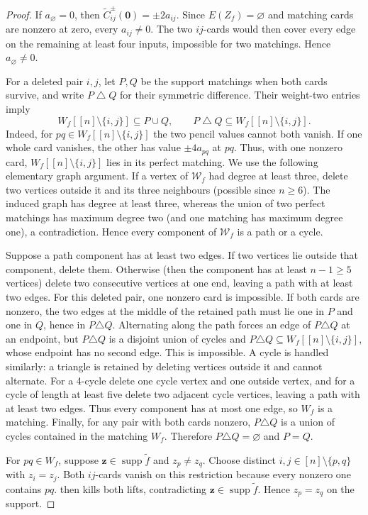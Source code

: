 \documentclass[11pt,letterpaper,onecolumn]{article}
\theoremstyle{plain}
\theoremstyle{definition}
\theoremstyle{remark}
\newcommand{\supp}{\operatorname{supp}}
\newcommand{\zero}{\mathbf 0}
\begin{document}
\begin{proof}
If \(a_\varnothing=0\), then
\(\widetilde C_{ij}^{\pm}(\zero)=\pm2a_{ij}\).  Since
\(E(Z_f)=\varnothing\)
and matching cards are nonzero at zero, every \(a_{ij}\ne0\).  The two
\(ij\)-cards would then cover every edge on the remaining at least four
inputs, impossible for two matchings.  Hence \(a_\varnothing\ne0\).

For a deleted pair \(i,j\), let \(P,Q\) be the support matchings when both
cards survive, and write \(P\mathbin\triangle Q\) for their symmetric
difference.  Their weight-two entries imply
\begin{equation*}
  W_f[[n]\setminus\{i,j\}]\subseteq P\cup Q,
  \qquad
  P\mathbin\triangle Q
  \subseteq W_f[[n]\setminus\{i,j\}].
\end{equation*}
Indeed, for \(pq\in W_f[[n]\setminus\{i,j\}]\) the two pencil values cannot
both vanish. If one whole card vanishes, the other has value
\(\pm4a_{pq}\) at \(pq\).  Thus, with one nonzero card,
\(W_f[[n]\setminus\{i,j\}]\) lies in its perfect
matching.  We use the following elementary graph argument.  If a vertex of
\(\mathcal W_f\) had degree at least three, delete two vertices outside it and its
three neighbours (possible since \(n\ge6\)). The induced graph has degree at
least three, whereas the union of two perfect matchings has maximum degree
two (and one matching has maximum degree one), a contradiction.  Hence every
component of \(\mathcal W_f\) is a path or a cycle.

Suppose a path component has at least two edges.  If two vertices lie outside
that component, delete them. Otherwise (then the component has at least
\(n-1\ge5\) vertices) delete two consecutive vertices at one end, leaving a
path with at least two edges.  For this deleted pair, one nonzero card is
impossible.  If both cards are nonzero, the two edges at the middle of the
retained path must lie one in
\(P\) and one in \(Q\), hence in \(P\triangle Q\).  Alternating along the
path forces an edge of \(P\triangle Q\) at an endpoint, but
\(P\triangle Q\) is a disjoint union of cycles and
\(P\triangle Q\subseteq W_f[[n]\setminus\{i,j\}]\), whose endpoint has no
second edge.  This is impossible.  A cycle is handled similarly: a triangle
is retained by deleting vertices outside it and cannot alternate. For a
4-cycle delete one cycle vertex and one outside vertex, and for a cycle of
length at least five delete two adjacent cycle vertices, leaving a path with
at least two edges.  Thus every component has at most one edge, so \(W_f\)
is a matching.  Finally, for any pair with both cards nonzero,
\(P\triangle Q\) is a union of cycles contained in the matching \(W_f\).
Therefore \(P\triangle Q=\varnothing\) and \(P=Q\).

For \(pq\in W_f\), suppose \({\mathbf{z}}\in\supp\widetilde f\) and
\(z_p\ne z_q\).  Choose distinct \(i,j\in[n]\setminus\{p,q\}\) with
\(z_i=z_j\).  Both \(ij\)-cards vanish on this restriction because every
nonzero one contains \(pq\).  then kills both
lifts, contradicting \({\mathbf{z}}\in\supp\widetilde f\).  Hence \(z_p=z_q\) on the
support.
\end{proof}
\end{document}
